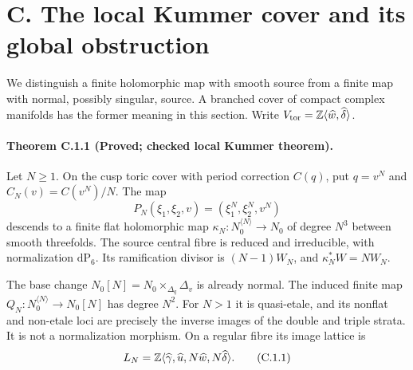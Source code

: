 \section{C. The local Kummer cover and its global obstruction}

We distinguish a finite holomorphic map with smooth source from a finite
map with normal, possibly singular, source. A branched cover of compact
complex manifolds has the former meaning in this section. Write
$V_{\rm tor}=\mathbb Z\langle\widehat w,\widehat\delta\rangle$.

\paragraph{Theorem C.1.1 (Proved; checked local Kummer theorem).}
Let $N\geq1$. On the cusp toric cover with period correction $C(q)$,
put $q=v^N$ and $C_N(v)=C(v^N)/N$. The map
\[
 P_N(\xi_1,\xi_2,v)=(\xi_1^N,\xi_2^N,v^N)
\]
descends to a finite flat holomorphic map
$\kappa_N:N_0^{\langle N\rangle}\to N_0$ of degree $N^3$ between
smooth threefolds. The source central fibre is reduced and irreducible,
with normalization $\mathrm{dP}_6$. Its ramification divisor is
$(N-1)W_N$, and $\kappa_N^*W=NW_N$.

The base change $N_0[N]=N_0\times_{\Delta_q}\Delta_v$ is already normal.
The induced finite map $Q_N:N_0^{\langle N\rangle}\to N_0[N]$ has
degree $N^2$. For $N>1$ it is quasi-etale, and its nonflat and non-etale
loci are precisely the inverse images of the double and triple strata.
It is not a normalization morphism. On a regular fibre its image lattice is
\[
 L_N=\mathbb Z\langle\widehat\gamma,\widehat u,
                   N\widehat w,N\widehat\delta\rangle.
 \tag{C.1.1}
\]

